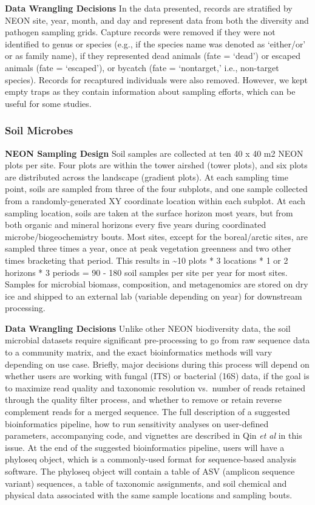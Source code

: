 \documentclass[
  12pt,
]{article}
\begin{document}
\textbf{Data Wrangling Decisions} In the data presented, records are stratified by NEON site, year, month, and day and represent data from both the diversity and pathogen sampling grids. Capture records were removed if they were not identified to genus or species (e.g., if the species name was denoted as `either/or' or as family name), if they represented dead animals (fate = `dead') or escaped animals (fate = `escaped'), or bycatch (fate = `nontarget,' i.e., non-target species). Records for recaptured individuals were also removed. However, we kept empty traps as they contain information about sampling efforts, which can be useful for some studies.

\hypertarget{soil-microbes}{%
\subsubsection{Soil Microbes}\label{soil-microbes}}

\textbf{NEON Sampling Design} Soil samples are collected at ten 40 x 40 m2 NEON plots per site. Four plots are within the tower airshed (tower plots), and six plots are distributed across the landscape (gradient plots). At each sampling time point, soils are sampled from three of the four subplots, and one sample collected from a randomly-generated XY coordinate location within each subplot. At each sampling location, soils are taken at the surface horizon most years, but from both organic and mineral horizons every five years during coordinated microbe/biogeochemistry bouts. Most sites, except for the boreal/arctic sites, are sampled three times a year, once at peak vegetation greenness and two other times bracketing that period. This results in \textasciitilde10 plots * 3 locations * 1 or 2 horizons * 3 periods = 90 - 180 soil samples per site per year for most sites. Samples for microbial biomass, composition, and metagenomics are stored on dry ice and shipped to an external lab (variable depending on year) for downstream processing.

\textbf{Data Wrangling Decisions} Unlike other NEON biodiversity data, the soil microbial datasets require significant pre-processing to go from raw sequence data to a community matrix, and the exact bioinformatics methods will vary depending on use case. Briefly, major decisions during this process will depend on whether users are working with fungal (ITS) or bacterial (16S) data, if the goal is to maximize read quality and taxonomic resolution vs.~number of reads retained through the quality filter process, and whether to remove or retain reverse complement reads for a merged sequence. The full description of a suggested bioinformatics pipeline, how to run sensitivity analyses on user-defined parameters, accompanying code, and vignettes are described in Qin \emph{et al} in this issue. At the end of the suggested bioinformatics pipeline, users will have a phyloseq object, which is a commonly-used format for sequence-based analysis software. The phyloseq object will contain a table of ASV (amplicon sequence variant) sequences, a table of taxonomic assignments, and soil chemical and physical data associated with the same sample locations and sampling bouts.
\end{document}
